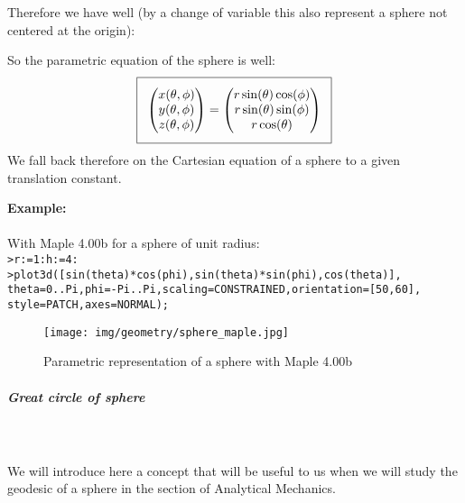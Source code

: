 {	Therefore we have well (by a change of variable this also represent a sphere not centered at the origin):
	
	So the parametric equation of the sphere is well:
	\begin{equation}
	  \addtolength{\fboxsep}{5pt}
	   \boxed{
	   \begin{gathered}
	   		\begin{pmatrix}
	   		x(\theta,\phi)\\y(\theta,\phi)\\z(\theta,\phi)
	   		\end{pmatrix}=
	   		\begin{pmatrix}
	   		r\sin(\theta)\cos(\phi)\\r\sin(\theta)\sin(\phi)\\r\cos(\theta)
	   		\end{pmatrix}
	   \end{gathered}
	   }
	\end{equation}
	We fall back therefore on the Cartesian equation of a sphere to a given translation constant.
	\begin{tcolorbox}[colframe=black,colback=white,sharp corners]
	\textbf{{\Large {}}Example:}\\\\
	With Maple 4.00b for a sphere of unit radius:\\

	\texttt{>r:=1:h:=4:\\
>plot3d([sin(theta)*cos(phi),sin(theta)*sin(phi),cos(theta)],\\
theta=0..Pi,phi=-Pi..Pi,scaling=CONSTRAINED,orientation=[50,60],\\
style=PATCH,axes=NORMAL);
	}
	\begin{figure}[H]
		\centering
		\texttt{[image: img/geometry/sphere\_maple.jpg]}
		\caption{Parametric representation of a sphere with Maple 4.00b}
	\end{figure}
	\end{tcolorbox}
	
	\subparagraph{Great circle of sphere}\mbox{}\\\\
	We will introduce here a concept that will be useful to us when we will study the geodesic of a sphere in the section of Analytical Mechanics.
	
}
